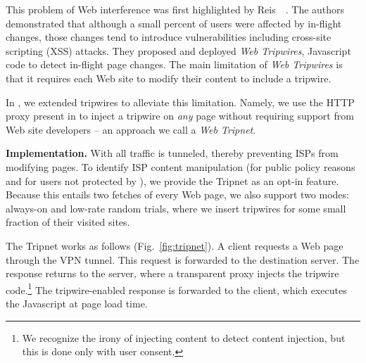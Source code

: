 This problem of Web interference was first highlighted by Reis~\etal~\cite{reis:tripwires}. 
The authors demonstrated that although a small percent of users were affected by in-flight changes, those changes tend to introduce vulnerabilities including cross-site scripting (XSS) attacks. 
They proposed and deployed \emph{Web Tripwires}, Javascript code to detect in-flight page changes. 
The main limitation of \emph{Web Tripwires} is that it requires each Web site to modify their content to include a tripwire.

In \meddle, we extended tripwires to alleviate this limitation. 
Namely, we use the HTTP proxy present in \meddle to inject a tripwire on \emph{any} page 
without requiring support from Web site developers -- an approach we call a \emph{Web Tripnet}.

\noindent\textbf{Implementation.} With \meddle all traffic is tunneled, thereby 
preventing ISPs from modifying pages. To identify ISP content manipulation 
(\eg for public policy reasons and for users not protected by \meddle), we provide the Tripnet as an opt-in feature. Because this entails 
two fetches of every Web page, we also support two modes: always-on and low-rate random trials, where we 
insert tripwires for some small fraction of their visited sites.

The Tripnet works as follows (Fig.~\ref{fig:tripnet}). A client requests a Web page through the \meddle VPN 
tunnel. This request is forwarded to the destination server. The response returns to 
the \meddle server, where a transparent proxy injects the tripwire code.\footnote{We 
recognize the irony of injecting content to detect content injection, but this is done only with user consent.}
The tripwire-enabled response is forwarded to the client, which executes the Javascript at page load time.


